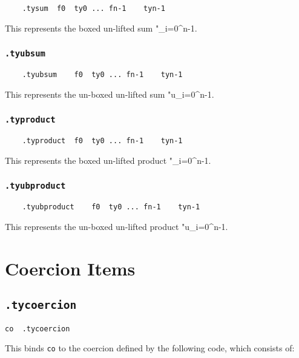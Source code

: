 \documentclass{report}
\newcommand\stringcode[1]{\texttt{#1}}
\begin{document}
\begin{verbatim}
	.tysum	f0	ty0	...	fn-1	tyn-1
\end{verbatim}

This represents the boxed un-lifted sum \<"\sum\left\langle{}_{i=0}^{n-1}\right\rangle\>.

\subsection{\stringcode{.tyubsum}}

\begin{verbatim}
	.tyubsum	f0	ty0	...	fn-1	tyn-1
\end{verbatim}

This represents the un-boxed un-lifted sum \<"u\sum\left\langle{}_{i=0}^{n-1}\right\rangle\>.

\subsection{\stringcode{.typroduct}}

\begin{verbatim}
	.typroduct	f0	ty0	...	fn-1	tyn-1
\end{verbatim}

This represents the boxed un-lifted product \<"\prod\left\langle{}_{i=0}^{n-1}\right\rangle\>.

\subsection{\stringcode{.tyubproduct}}

\begin{verbatim}
	.tyubproduct	f0	ty0	...	fn-1	tyn-1
\end{verbatim}

This represents the un-boxed un-lifted product \<"u\prod\left\langle{}_{i=0}^{n-1}\right\rangle\>.

\chapter{Coercion Items}

\section{\stringcode{.tycoercion}}

\begin{verbatim}
co	.tycoercion
\end{verbatim}
This binds \stringcode{co} to the coercion defined by the following code, which consists of:
\end{document}
